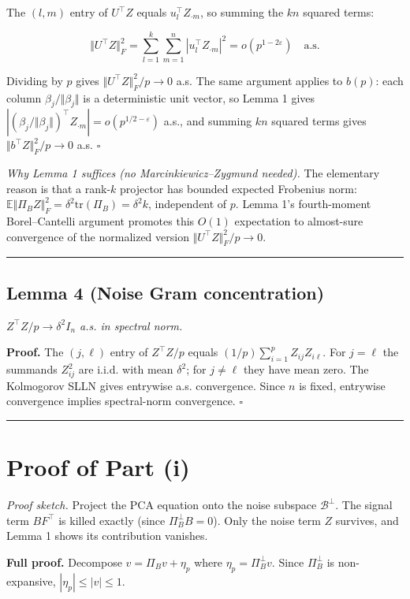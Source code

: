 \documentclass{article}
\theoremstyle{remark}
\begin{document}
The $(l,m)$ entry of $U^\top Z$ equals $u_l^\top Z_{\cdot m}$, so summing the $kn$ squared terms:

\[
\Vert U^\top Z\Vert_F^2 = \sum_{l=1}^k\sum_{m=1}^n |u_l^\top Z_{\cdot m}|^2 = o(p^{1-2\varepsilon}) \quad\text{a.s.}
\]

Dividing by $p$ gives $\Vert U^\top Z\Vert_F^2/p \to 0$ a.s. The same argument applies to $b(p)$: each column $\beta_j/\Vert \beta_j\Vert $ is a deterministic unit vector, so Lemma 1 gives $|(\beta_j/\Vert \beta_j\Vert )^\top Z_{\cdot m}| = o(p^{1/2-\varepsilon})$ a.s., and summing $kn$ squared terms gives $\Vert b^\top Z\Vert_F^2/p \to 0$ a.s. $\square$

\textit{Why Lemma 1 suffices (no Marcinkiewicz–Zygmund needed).} The elementary reason is that a rank-$k$ projector has bounded expected Frobenius norm: $\mathbb{E}\Vert \Pi_B Z\Vert_F^2 = \delta^2\mathrm{tr}(\Pi_B) = \delta^2 k$, independent of $p$. Lemma 1's fourth-moment Borel–Cantelli argument promotes this $O(1)$ expectation to almost-sure convergence of the normalized version $\Vert U^\top Z\Vert_F^2/p \to 0$.

\medskip\noindent\rule{\linewidth}{0.4pt}\medskip

\subsection{Lemma 4 (Noise Gram concentration)}

\textit{$Z^\top Z/p \to \delta^2 I_n$ a.s. in spectral norm.}

\textbf{Proof.} The $(j,\ell)$ entry of $Z^\top Z/p$ equals $(1/p)\sum_{i=1}^p Z_{ij}Z_{i\ell}$. For $j = \ell$ the summands $Z_{ij}^2$ are i.i.d. with mean $\delta^2$; for $j\ne\ell$ they have mean zero. The Kolmogorov SLLN gives entrywise a.s. convergence. Since $n$ is fixed, entrywise convergence implies spectral-norm convergence. $\square$

\medskip\noindent\rule{\linewidth}{0.4pt}\medskip

\section{Proof of Part (i)}

\textit{Proof sketch.} Project the PCA equation onto the noise subspace $\mathcal{B}^\perp$. The signal term $BF^\top$ is killed exactly (since $\Pi_B^\perp B = 0$). Only the noise term $Z$ survives, and Lemma 1 shows its contribution vanishes.

\textbf{Full proof.} Decompose $v = \Pi_B v + \eta_p$ where $\eta_p = \Pi_B^\perp v$. Since $\Pi_B^\perp$ is non-expansive, $|\eta_p|\le|v|\le 1$.
\end{document}
